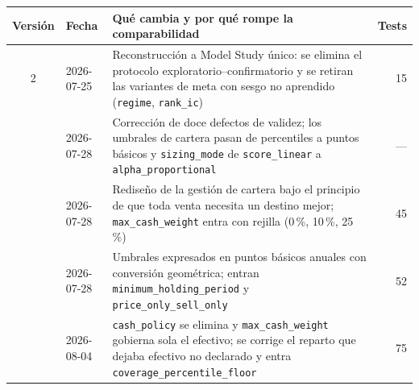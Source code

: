 \begin{tabularx}{\textwidth}{clXr}
\toprule
Versión & Fecha & Qué cambia y por qué rompe la comparabilidad & Tests \\
\midrule
2 & 2026-07-25 &
Reconstrucción a Model Study único: se elimina el protocolo exploratorio--confirmatorio y se retiran
las variantes de meta con sesgo no aprendido (\texttt{regime}, \texttt{rank\_ic}) &
15 \\
\addlinespace
3 & 2026-07-28 &
Corrección de doce defectos de validez; los umbrales de cartera pasan de percentiles a puntos
básicos y \texttt{sizing\_mode} de \texttt{score\_linear} a \texttt{alpha\_proportional} &
--- \\
\addlinespace
4 & 2026-07-28 &
Rediseño de la gestión de cartera bajo el principio de que toda venta necesita un destino mejor;
\texttt{max\_cash\_weight} entra con rejilla (0\,\%, 10\,\%, 25\,\%) &
45 \\
\addlinespace
5 & 2026-07-28 &
Umbrales expresados en puntos básicos anuales con conversión geométrica; entran
\texttt{minimum\_holding\_period} y \texttt{price\_only\_sell\_only} &
52 \\
\addlinespace
6 & 2026-08-04 &
\texttt{cash\_policy} se elimina y \texttt{max\_cash\_weight} gobierna sola el efectivo; se corrige
el reparto que dejaba efectivo no declarado y entra \texttt{coverage\_percentile\_floor} &
75 \\
\bottomrule
\end{tabularx}
